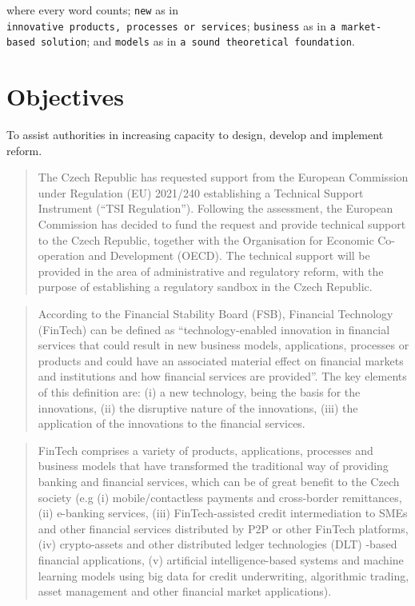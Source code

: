 \documentclass[
]{book}
\begin{document}
where every word counts; \texttt{new} as in \texttt{innovative\ products,\ processes\ or\ services}; \texttt{business} as in \texttt{a\ market-based\ solution}; and \texttt{models} as in \texttt{a\ sound\ theoretical\ foundation}.

\hypertarget{objectives}{%
\section{Objectives}\label{objectives}}

To assist authorities in increasing capacity to design, develop and implement reform.

\begin{quote}
The Czech Republic has requested support from the European Commission under Regulation (EU) 2021/240 establishing a Technical Support Instrument (``TSI Regulation'').
Following the assessment, the European Commission has decided to fund the request and provide technical support to the Czech Republic, together with the Organisation for Economic Co-operation and Development (OECD). The technical support will be provided in the area of administrative and regulatory reform, with the purpose of establishing a regulatory sandbox in the Czech Republic.
\end{quote}

\begin{quote}
According to the Financial Stability Board (FSB), Financial Technology (FinTech) can be defined as ``technology-enabled innovation in financial services that could result in new business models, applications, processes or products and could have an associated material effect on financial markets and institutions and how financial services are provided''. The key elements of this definition are: (i) a new technology, being the basis for the innovations, (ii) the disruptive nature of the innovations, (iii) the application of the innovations to the financial services.
\end{quote}

\begin{quote}
FinTech comprises a variety of products, applications, processes and business models that have transformed the traditional way of providing banking and financial services, which can be of great benefit to the Czech society (e.g (i) mobile/contactless payments and cross-border remittances, (ii) e-banking services, (iii) FinTech-assisted credit intermediation to SMEs and other financial services distributed by P2P or other FinTech platforms, (iv) crypto-assets and other distributed ledger technologies (DLT) -based financial applications, (v) artificial intelligence-based systems and machine learning models using big data for credit underwriting, algorithmic trading, asset management and other financial market applications).
\end{quote}
\end{document}
